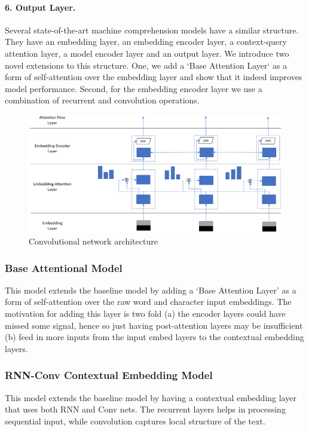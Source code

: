 \paragraph{6. Output Layer.} Several state-of-the-art machine comprehension models have a similar structure. They have an embedding layer, an embedding encoder layer, a context-query attention layer, a model encoder layer and an output layer. We introduce two novel extensions to this structure.  One, we add a `Base Attention Layer` as a form of self-attention over the embedding layer and show that it indeed improves model performance. Second, for the embedding encoder layer we use a combination of recurrent and convolution operations. 

\begin{figure}[h!]
\centering
	\includegraphics[width=12cm]{Figs4Paper/ModifiedLayers.eps}
  \caption{Convolutional network architecture}
  \label{fig:convnetarchitecture}
\end{figure}


\subsubsection{Base Attentional Model}
\label{subsubsec:baseattentionalmodel}

This model extends the baseline model by adding a `Base Attention Layer' as a form of self-attention over the raw word and character input embeddings. The motivation for adding this layer is two fold (a) the encoder layers could have missed some signal, hence  so just having post-attention layers may be insufficient (b) feed in more inputs from the input embed layers to the contextual embedding layers.


\subsubsection{RNN-Conv Contextual Embedding Model}
\label{subsubsec:rnnconvcontextualembeddingmodel}

This model extends the baseline model by having a contextual embedding layer that uses both RNN and Conv nets. The recurrent layers helps in processing sequential input, while convolution captures local structure of the text.  
